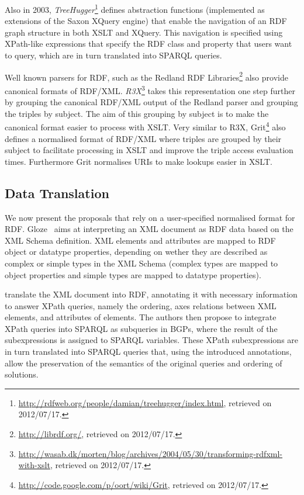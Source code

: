 Also in 2003, \emph{TreeHugger}\footnote{\scriptsize\url{http://rdfweb.org/people/damian/treehugger/index.html},
  retrieved on 2012/07/17.}  defines abstraction functions (implemented as extensions of the Saxon XQuery engine) that
enable the navigation of an \ac{RDF} graph structure in both \ac{XSLT} and XQuery.
%
This navigation is specified using XPath-like expressions that specify the \ac{RDF} class and property that users want
to query, which are in turn translated into SPARQL queries.

Well known parsers for \ac{RDF}, such as the Redland \ac{RDF} Libraries\footnote{\url{http://librdf.org/}, retrieved on
  2012/07/17.} also provide canonical formats of RDF/XML.
%
\emph{R3X}\footnote{\url{http://wasab.dk/morten/blog/archives/2004/05/30/transforming-rdfxml-with-xslt}, retrieved on
  2012/07/17.} takes this representation one step further by grouping the canonical RDF/XML output of the Redland parser
and grouping the triples by subject.  The aim of this grouping by subject is to make the canonical format easier to
process with \ac{XSLT}.
%
Very similar to R3X, Grit\footnote{\url{http://code.google.com/p/oort/wiki/Grit}, retrieved on 2012/07/17.} also defines
a normalised format of RDF/XML where triples are grouped by their subject to facilitate processing in \ac{XSLT} and
improve the triple access evaluation times.  Furthermore Grit normalises \acp{URI} to make lookups easier in
\ac{XSLT}. 


\subsection*{Data Translation}
\label{sec:data-translation}
%
We now present the proposals that rely on a user-specified normalised format for \ac{RDF}.
%
Gloze~\cite{Battle:2006aa} aims at interpreting an \ac{XML} document as \ac{RDF} data based on the \ac{XML} Schema
definition.
%
\ac{XML} elements and attributes are mapped to \ac{RDF} object or datatype properties, depending on wether they are
described as complex or simple types in the XML Schema (complex types are mapped to object properties and simple types
are mapped to datatype properties). 

\citet{DroopFlarerGroppe:2008aa} translate the \ac{XML} document into RDF, annotating it with necessary information to
answer XPath queries, namely the ordering, axes relations between XML elements, and attributes of elements.
%
The authors then propose to integrate XPath queries into SPARQL as subqueries in \acp{BGP}, where the result of the
subexpressions is assigned to SPARQL variables.
%
These XPath subexpressions are in turn translated into SPARQL queries that, using the introduced annotations, allow the
preservation of the semantics of the original queries and ordering of solutions.

